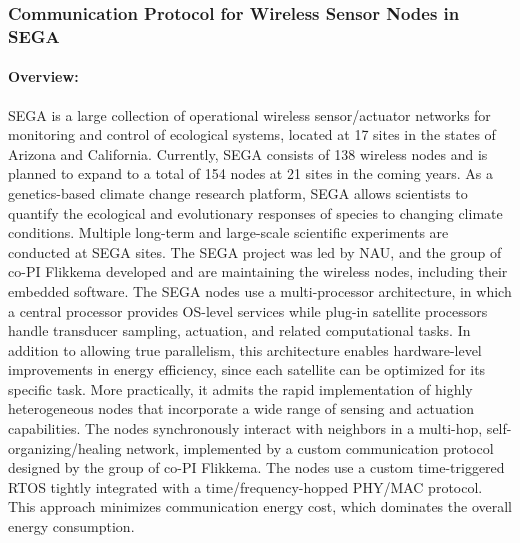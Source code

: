 \subsubsection{Communication Protocol for Wireless Sensor Nodes in SEGA}
\label{sec:sega-case-study}

\paragraph{Overview:}

SEGA is a large collection of operational wireless sensor/actuator networks for monitoring and control of ecological systems, located at 17 sites in the states of Arizona and California.
Currently, SEGA consists of 138 wireless nodes and is planned to expand to a total of 154 nodes at 21 sites in the coming years.
As a genetics-based climate change research platform, SEGA allows scientists to quantify the ecological and evolutionary responses of species to changing climate conditions.
Multiple long-term and large-scale scientific experiments are conducted at SEGA sites.
The SEGA project was led by NAU, and the group of co-PI Flikkema developed and are maintaining the wireless nodes, including their embedded software.
%
The SEGA nodes use a multi-processor architecture, in which a central processor provides OS-level services %
while plug-in satellite processors handle transducer sampling, actuation, and related computational tasks.
In addition to allowing true parallelism, this architecture enables hardware-level improvements in energy efficiency, since each satellite can be optimized for its specific task.
More practically, it admits the rapid implementation of highly heterogeneous nodes that incorporate a wide range of sensing and actuation capabilities.
%
The nodes synchronously interact with neighbors in a multi-hop, self-organizing/healing network, implemented by a custom communication protocol designed by the group of co-PI Flikkema. %
The nodes use a custom time-triggered RTOS tightly integrated with a time/frequency-hopped PHY/MAC protocol.
This approach %
minimizes communication energy cost, which dominates the overall energy consumption.

